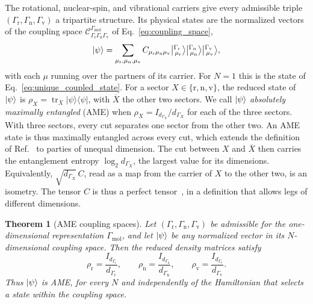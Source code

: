 \documentclass[
  reprint,
  aps,
  prx,
  superscriptaddress,
  amsmath,
  amssymb,
  longbibliography
]{revtex4-2}
\newcommand{\trace}{\operatorname{tr}}
\newcommand{\irket}[2]{\bigl\lvert{}^{#1}_{\,#2}\bigr\rangle}
\newtheorem{theorem}{Theorem}
\newcommand{\ketbra}[2]{|#1\rangle\langle#2|}
\providecommand{\Gmol}{\Gamma_{\mathrm{mol}}}
\providecommand{\Grot}{\Gamma_{\mathrm{r}}}
\providecommand{\Gvib}{\Gamma_{\mathrm{v}}}
\providecommand{\Gspin}{\Gamma_{\mathrm{n}}}
\begin{document}
The rotational, nuclear-spin, and vibrational carriers give every admissible triple $(\Grot,\Gspin,\Gvib)$ a tripartite structure. Its physical states are the normalized vectors of the coupling space $\mathcal C^{\Gmol}_{\Grot\Gspin\Gvib}$ of Eq.~\eqref{eq:coupling_space},
\begin{equation}
\ket{\psi}
=
\sum_{\mu_{\mathrm r},\mu_{\mathrm n},\mu_{\mathrm v}}
C_{\mu_{\mathrm r}\mu_{\mathrm n}\mu_{\mathrm v}}
\irket{\Grot}{\mu_{\mathrm r}}
\irket{\Gspin}{\mu_{\mathrm n}}
\irket{\Gvib}{\mu_{\mathrm v}},
\label{eq:carrier_state}
\end{equation}
with each $\mu$ running over the partners of its carrier. For $N=1$ this is the state of Eq.~\eqref{eq:unique_coupled_state}. For a sector $X\in\{\mathrm r,\mathrm n,\mathrm v\}$, the reduced state of $\ket{\psi}$ is $\rho_X=\trace_{\overline X}\ketbra{\psi}{\psi}$, with $\overline X$ the other two sectors. We call $\ket{\psi}$ \emph{absolutely maximally entangled} (AME) when $\rho_X=I_{d_{\Gamma_X}}/d_{\Gamma_X}$ for each of the three sectors. With three sectors, every cut separates one sector from the other two. An AME state is thus maximally entangled across every cut, which extends the definition of Ref.~\cite{Helwig2012} to parties of unequal dimension. The cut between $X$ and $\overline X$ then carries the entanglement entropy $\log_2 d_{\Gamma_X}$, the largest value for its dimensions. Equivalently, $\sqrt{d_{\Gamma_X}}\,C$, read as a map from the carrier of $X$ to the other two, is an isometry. The tensor $C$ is thus a perfect tensor~\cite{Pastawski2015}, in a definition that allows legs of different dimensions.

\begin{theorem}[AME coupling spaces]
\label{thm:ame}
Let $(\Grot,\Gspin,\Gvib)$ be admissible for the one-dimensional representation $\Gmol$, and let $\ket{\psi}$ be any normalized vector in its $N$-dimensional coupling space. Then the reduced density matrices satisfy
\begin{equation}
\boxed{
\rho_{\mathrm r}=\frac{I_{d_{\Grot}}}{d_{\Grot}},
\qquad
\rho_{\mathrm n}=\frac{I_{d_{\Gspin}}}{d_{\Gspin}},
\qquad
\rho_{\mathrm v}=\frac{I_{d_{\Gvib}}}{d_{\Gvib}}.
}
\label{eq:marginals}
\end{equation}
Thus $\ket{\psi}$ is AME, for every $N$ and independently of the Hamiltonian that selects a state within the coupling space.
\end{theorem}
\end{document}
